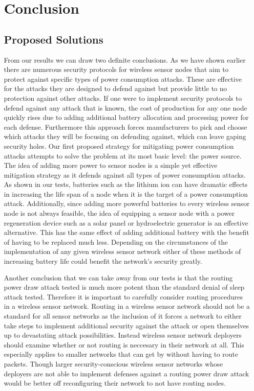 \section{Conclusion}

\subsection{Proposed Solutions}
From our results we can draw two definite conclusions. As we have shown earlier there are numerous security protocols for wireless sensor nodes that aim to protect against specific types of power consumption attacks. These are effective for the attacks they are designed to defend against but provide little to no protection against other attacks. If one were to implement security protocols to defend against any attack that is known, the cost of production for any one node quickly rises due to adding additional battery allocation and processing power for each defense. Furthermore this approach forces manufacturers to pick and choose which attacks they will be focusing on defending against, which can leave gaping security holes.  Our first proposed strategy for mitigating power consumption attacks attempts to solve the problem at its most basic level: the power source. The idea of adding more power to sensor nodes is a simple yet effective mitigation strategy as it defends against all types of power consumption attacks.  As shown in our tests, batteries such as the lithium ion can have dramatic effects in increasing the life span of a node when it is the target of a power consumption attack. Additionally, since adding more powerful batteries to every wireless sensor node is not always feasible, the idea of equipping a sensor node with a power regeneration device such as a solar panel or hydroelectric generator is an effective alternative. This has the same effect of adding additional battery with the benefit of having to be replaced much less. Depending on the circumstances of the implementation of any given wireless sensor network either of these methods of increasing battery life could benefit the network's security greatly.

Another conclusion that we can take away from our tests is that the routing power draw attack tested is much more potent than the standard denial of sleep attack tested. Therefore it is important to carefully consider routing procedures in a wireless sensor network. Routing in a wireless sensor network should not be a standard for all sensor networks as the inclusion of it forces a network to either take steps to implement additional security against the attack or open themselves up to devastating attack possibilities. Instead wireless sensor network deployers should examine whether or not routing is neccesary in their network at all. This especially applies to smaller networks that can get by without having to route packets.  Though larger security-conscious wireless sensor networks whose deployers are not able to implement defenses against a routing power draw attack would be better off reconfiguring their network to not have routing nodes.  

